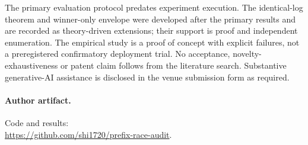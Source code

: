\documentclass[12pt]{clear2027}
\begin{document}
The primary evaluation protocol predates experiment execution. The identical-log theorem and winner-only envelope were developed after the primary results and are recorded as theory-driven extensions; their support is proof and independent enumeration. The empirical study is a proof of concept with explicit failures, not a preregistered confirmatory deployment trial. No acceptance, novelty-exhaustiveness or patent claim follows from the literature search. Substantive generative-AI assistance is disclosed in the venue submission form as required.
\ifdefined\namedversion
\paragraph{Author artifact.} Code and results:\\ \url{https://github.com/shi1720/prefix-race-audit}. 
\fi
\end{document}
